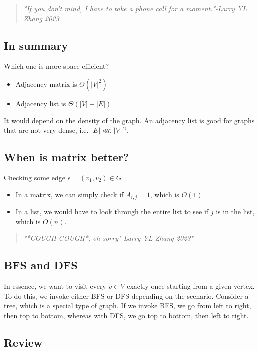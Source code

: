 \documentclass[12pt]{book}
\begin{document}
\begin{quote}
    \textit{"If you don't mind, I have to take a phone call for a moment."-Larry YL Zhang 2023}
\end{quote}

\subsection*{In summary}
Which one is more space efficient?
\begin{itemize}
    \item Adjacency matrix is $\Theta (|V|^2)$
    \item Adjacency list is $\Theta (|V|+|E|)$
\end{itemize}

It would depend on the density of the graph. An adjacency list is good for graphs that are not very dense, i.e. $|E|\llless |V|^2$.

\subsection*{When is matrix better?}
Checking some edge $\epsilon =(v_1,v_2)\in G$

\begin{itemize}
    \item In a matrix, we can simply check if $A_{i,j}=1$, which is $O(1)$
    \item In a list, we would have to look through the entire list to see if $j$ is in the list, which is $O(n)$.
\end{itemize}

\begin{quote}
    \textit{"*COUGH COUGH*, oh sorry"-Larry YL Zhang 2023"}
\end{quote}

\subsection*{BFS and DFS}
In essence, we want to visit every $v\in V$ exactly once starting from a given vertex. To do this, we invoke either BFS or DFS depending on the scenario. Consider a tree, which is a special type of graph. If we invoke BFS, we go from left to right, then top to bottom, whereas with DFS, we go top to bottom, then left to right. 

\subsection*{Review}
\end{document}
